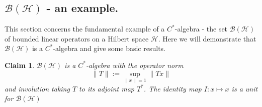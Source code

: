 \documentclass[12pt,a4paper]{amsart}
\theoremstyle{plain}
\newtheorem*{claim}{Claim}
\theoremstyle{definition}
\renewcommand{\H}{\mathcal{H}}
\newcommand{\B}{\mathcal{B}}
\newcommand{\BH}{\mathcal{\B(\H)}}
\newcommand{\1}{\mathbbm{1}}
\begin{document}


\subsection{$\B(\H)$ - an example.}
This section concerns the fundamental example of a $C^\ast$-algebra - the set $\B(\H)$ of bounded 
linear operators on a Hilbert space $\H$.  
Here we will demonstrate that $\B(\H)$ is a $C^\ast$-algebra and give some basic results.

\begin{claim} $\B(\H)$ is a $C^\ast$-algebra with the operator norm 
\[
	\|T\|:= \sup_{\|x\|=1}{\|Tx\|}
\]
and involution taking $T$ to its adjoint map $T^\ast$. 
The identity map $I:x\mapsto x$ is a unit for $\BH$
\end{claim}
\end{document}
